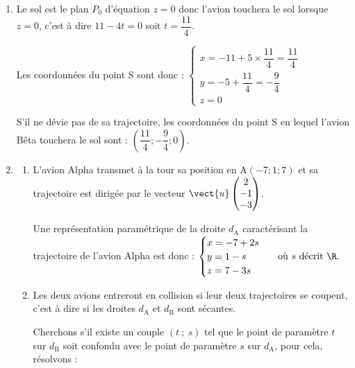 \begin{enumerate}
\item Le sol est le plan $P_{0}$ d'équation $z=0$ donc l'avion touchera le sol lorsque $z=0$, c'est à dire $11-4t=0$ soit $t=\dfrac{11}{4}$.

Les coordonnées du point S sont donc : $\begin{cases} x = -11 + 5\times\dfrac{11}{4} = \dfrac{11}{4}  \\ y = -5 + \dfrac{11}{4} =-\dfrac{9}{4}\\ z = 0 \end{cases}$

S'il ne dévie pas de sa trajectoire,  les coordonnées du point S en lequel l'avion Bêta touchera le sol sont : $\left(\dfrac{11}{4};-\dfrac{9}{4};0\right)$.
\item
	\begin{enumerate}
		\item  L'avion Alpha transmet à la tour sa position en A$(-7; 1; 7)$ et sa trajectoire est dirigée par le vecteur $\vect{u}\begin{pmatrix}2\\-1\\-3\end{pmatrix}$.

Une représentation paramétrique de la droite $d_{\mathrm{A}}$ caractérisant la trajectoire de l'avion Alpha est donc :
$\begin{cases} x = -7 + 2s \\ y = 1 -s \\ z = 7 - 3s \end{cases}~\text{ où } s \text{ décrit } \R.$

		\item Les deux avions entreront  en collision si leur deux trajectoires se coupent, c'est à dire si les droites $d_{\mathrm{A}}$ et $d_{\mathrm{B}}$ sont sécantes.

Cherchons s'il existe un couple $(t~;~s)$ tel que le point de paramètre $t$ sur $d_{\mathrm{B}}$ soit confondu avec le point de paramètre $s$ sur $d_{\mathrm{A}}$, pour cela, résolvons :


\end{enumerate}
\end{enumerate}
